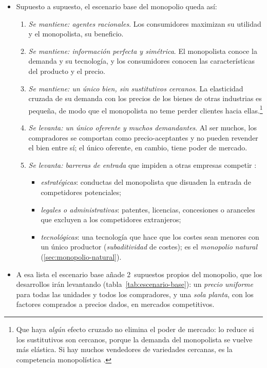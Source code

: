\documentclass[11pt]{article}
\begin{document}
\begin{itemize}
\item Supuesto a supuesto, el escenario base del monopolio queda así:
  \begin{enumerate}
  \item \emph{Se mantiene: agentes racionales}. Los consumidores maximizan su utilidad y el monopolista, su beneficio.
  \item \emph{Se mantiene: información perfecta y simétrica}. El monopolista conoce la demanda y su tecnología, y los consumidores conocen las características del producto y el precio.
  \item \emph{Se mantiene: un único bien, sin sustitutivos cercanos}. La elasticidad cruzada de su demanda con los precios de los bienes de otras industrias es pequeña, de modo que el monopolista no teme perder clientes hacia ellas.\footnote{Que haya \emph{algún} efecto cruzado no elimina el poder de mercado: lo reduce si los sustitutivos son cercanos, porque la demanda del monopolista se vuelve más elástica. Si hay muchos vendedores de variedades cercanas, es la competencia monopolística .}
  \item \emph{Se levanta: un único oferente y muchos demandantes}. Al ser muchos, los compradores se comportan como precio-aceptantes y no pueden revender el bien entre sí; el único oferente, en cambio, tiene poder de mercado.
  \item \emph{Se levanta: barreras de entrada} que impiden a otras empresas competir :
    \begin{itemize}
    \item \emph{estratégicas}: conductas del monopolista que disuaden la entrada de competidores potenciales;
    \item \emph{legales o administrativas}: patentes, licencias, concesiones o aranceles que excluyen a los competidores extranjeros;
    \item \emph{tecnológicas}: una tecnología que hace que los costes sean menores con un único productor (\emph{subaditividad} de costes); es el \emph{monopolio natural} (\ref{sec:monopolio-natural}).
    \end{itemize}
  \end{enumerate}
\item A esa lista el escenario base añade 2~supuestos propios del monopolio, que los desarrollos irán levantando (tabla~\ref{tab:escenario-base}): un \emph{precio uniforme} para todas las unidades y todos los compradores, y una \emph{sola planta}, con los factores comprados a precios dados, en mercados competitivos.

\end{itemize}
\end{document}
